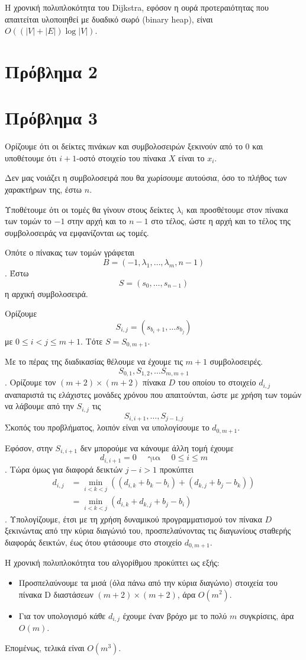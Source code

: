 \documentclass[12pt]{article}
\begin{document}
Η χρονική πολυπλοκότητα του Dijkstra, εφόσον η ουρά προτεραιότητας που απαιτείται υλοποιηθεί με δυαδικό σωρό (binary heap), είναι \(O((|V| + |E|)\log |V|)\). \hfill \blacksquare 

\newpage
\section*{Πρόβλημα 2 }

\newpage
\section*{Πρόβλημα 3} 
Ορίζουμε ότι οι δείκτες πινάκων και συμβολοσειρών ξεκινούν από το \(0\) και υποθέτουμε ότι \(i+1\)-οστό στοιχείο του πίνακα \(X\) είναι το \(x_i\).
\bigskip

Δεν μας νοιάζει η συμβολοσειρά που θα χωρίσουμε αυτούσια, όσο το πλήθος των χαρακτήρων της, έστω \(n\). 

Υποθέτουμε ότι οι τομές θα γίνουν στους δείκτες \(\lambda_i\) και προσθέτουμε στον πίνακα των τομών το \(-1\) στην αρχή και το \(n-1\) στο τέλος, ώστε η αρχή και το τέλος της συμβολοσειράς να εμφανίζονται ως τομές. 

Οπότε ο πίνακας των τομών γράφεται 
\[
    B = (-1, \lambda_1, \ldots, \lambda_m, n-1)
\].
Έστω \[S = (s_0, \ldots, s_{n-1})\] η αρχική συμβολοσειρά. 

Ορίζουμε 
\[
    S_{i,j} = (s_{b_i+1},\ldots s_{b_j})
\] με \(0 \leq i < j \leq m+1\).
Tότε \(S = S_{0, m+1}\).

Με το πέρας της διαδικασίας θέλουμε να έχουμε τις \(m+1\) συμβολοσειρές. 
\[
    S_{0,1}, S_{1,2}, \ldots S_{m, m+1}
\].
Ορίζουμε τον \((m+2) \times (m+2)\) πίνακα \(D\) του οποίου το στοιχείο \(d_{i,j}\) αναπαριστά τις ελάχιστες μονάδες χρόνου που απαιτούνται, ώστε με χρήση των τομών να λάβουμε από την \(S_{i, j}\) τις 
\[
    S_{i,i+1},\ldots, S_{j-1, j}\]
Σκοπός του προβλήματος, λοιπόν είναι να υπολογίσουμε το \(d_{0, m+1}\). 

Εφόσον, στην \(S_{i,i+1}\) δεν μπορούμε να κάνουμε άλλη τομή έχουμε 
\[
    d_{i,i+1} = 0 \quad \text{  για  }\quad 0 \leq i \leq m\].
Τώρα όμως για διαφορά δεικτών \(j - i > 1\) προκύπτει
\begin{align*}
    d_{i,j} &= \min_{i < k < j} \left( (d_{i,k} + b_k - b_i) + (d_{k,j} + b_j - b_k) \right) \\
            &= \min_{i < k < j} \left( d_{i,k}+ d_{k,j} + b_j - b_i \right)
\end{align*}
. Υπολογίζουμε, έτσι με τη χρήση δυναμικού προγραμματισμού τον πίνακα \(D\) ξεκινώντας από την κύρια διαγώνιό του, προσπελαύνοντας τις διαγωνίους σταθερής διαφοράς δεικτών, έως ότου φτάσουμε στο στοιχείο \(d_{0, m+1}\). 

\bigskip
Η χρονική πολυπλοκότητα του αλγορίθμου προκύπτει ως εξής: 
\begin{itemize}
    \item Προσπελαύνουμε τα μισά (όλα πάνω από την κύρια διαγώνιο) στοιχεία του πίνακα D διαστάσεων \((m+2)\times (m+2)\), άρα \(O(m^2)\).
    \item Για τον υπολογισμό κάθε \(d_{i,j}\) έχουμε έναν βρόχο με το πολύ \(m\) συγκρίσεις, άρα \(O(m)\).
\end{itemize}
Επομένως, τελικά είναι \(O(m^3)\). \hfill \blacksquare
\end{document}
